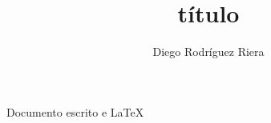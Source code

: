 \documentclass[a4paper,10pt]{article}
\title{título}
\author{Diego Rodríguez Riera}
\begin{document}
\maketitle
\pagebreak
\tableofcontents
\pagebreak



\raggedleft Documento escrito e \LaTeX{}
\end{document}
